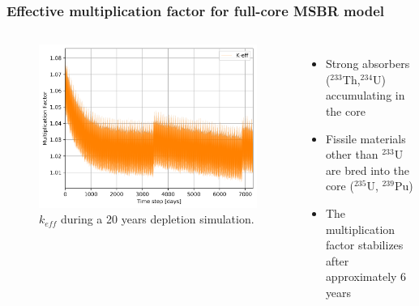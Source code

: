 \begin{frame}
  \frametitle{Effective multiplication factor for full-core \gls{MSBR} model }
    \begin{columns}
    \column[t]{7cm}
   \vspace{-0.35in}
  \begin{figure}[t]
   \hspace*{-0.2in}
   \includegraphics[height=0.75\textheight]{./images/keff.png}
   \vspace{-0.05in}
   \caption{$k_{eff}$ during a 20 years depletion simulation.}
    \end{figure}

    \column[t]{4.5cm}
       \begin{itemize}
	        \item Strong absorbers ($^{233}$Th,$^{234}$U) accumulating in the core
   		\item Fissile materials other than $^{233}$U are bred into the core ($^{235}$U, $^{239}$Pu)
   		\item The multiplication factor stabilizes after approximately 6 years
       \end{itemize}
     \end{columns}
\end{frame}

